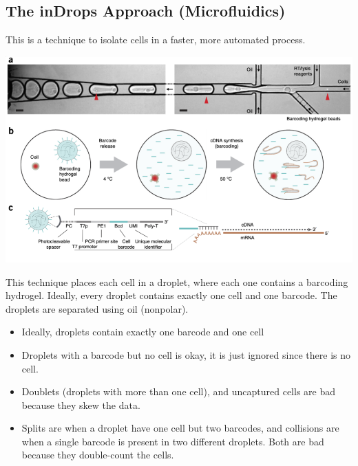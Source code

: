 \documentclass[10pt]{article}
\begin{document}
\subsection*{The inDrops Approach (Microfluidics)}
This is a technique to isolate cells in a faster, more automated process.
\begin{center}
    \includegraphics*[scale=0.7]{W7_3.png}
\end{center}
This technique places each cell in a droplet, where each one contains a barcoding hydrogel.  Ideally, every droplet contains exactly one cell and one barcode.  The droplets are separated using oil (nonpolar).
\begin{itemize}
    \item Ideally, droplets contain exactly one barcode and one cell
    \item Droplets with a barcode but no cell is okay, it is just ignored since there is no cell.
    \item Doublets (droplets with more than one cell), and uncaptured cells are bad because they skew the data.
    \item Splits are when a droplet have one cell but two barcodes, and collisions are when a single barcode is present in two different droplets.  Both are bad because they double-count the cells.
\end{itemize}
\end{document}
